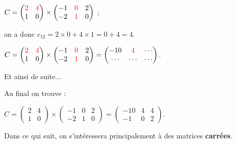 {     \par
     $C=\begin{pmatrix} \color{red}{2} & \color{red}{4} \\ 1 & 0\end{pmatrix}\times\begin{pmatrix}-1 & \color{red}{0} & 2 \\ -2 & \color{red}{1} & 0\end{pmatrix}$ ;
     \par
     on a donc $c_{12}=2\times 0+4\times 1=0+4=4$.
     \par
     $C=\begin{pmatrix} \color{red}{2} & \color{red}{4} \\ 1 & 0\end{pmatrix}\times \begin{pmatrix} -1 & \color{red}{0} & 2 \\ -2 & \color{red}{1} & 0\end{pmatrix}=\begin{pmatrix}-10 & \color{red}{4} & \cdots \\ \cdots & \cdots & \cdots \end{pmatrix}$.
     \par
     Et ainsi de suite...
     \par
     Au final on trouve :
     \par
     $C=\begin{pmatrix} 2 & 4 \\ 1 & 0\end{pmatrix}\times \begin{pmatrix}-1 & 0 & 2 \\ -2 & 1 & 0\end{pmatrix}=\begin{pmatrix}-10 & 4 & 4 \\ -1 & 0 & 2 \end{pmatrix}$.
}
Dans ce qui suit, on s'intéressera principalement à des matrices \textbf{carrées}.
